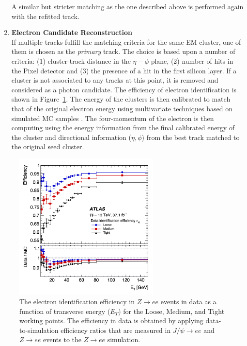 \begin{enumerate}
        A similar but stricter matching as the one described above is performed again with the refitted track.
    \item \textbf{Electron Candidate Reconstruction}\\
        If multiple tracks fulfill the matching criteria for the same EM cluster, one of them is chosen as the \textit{primary} track.
        The choice is based upon a number of criteria: (1) cluster-track distance in the $\eta-\phi$ plane, (2) number of hits in the Pixel detector and (3) the presence of a hit in the first silicon layer.
        If a cluster is not associated to any tracks at this point, it is removed and considered as a photon candidate.
        The efficiency of electron identification is shown in Figure~\ref{fig:electron_eff_Zee}.
        The energy of the clusters is then calibrated to match that of the original electron energy using multivariate techniques based on simulated MC samples \cite{Aaboud:2018ugz}.
        The four-momentum of the electron is then computing using the energy information from the final calibrated energy of the cluster and directional information ($\eta, \phi$) from the best track matched to the original seed cluster.
\end{enumerate}

\begin{figure}
	\centering
	\includegraphics[width=0.65\textwidth]{electron_eff_Zee}
	\caption{
	    The electron identification efficiency in $Z \rightarrow ee$ events in data as a function of transverse energy ($E_T$) for the Loose, Medium, and Tight working points.
	    The efficiency in data is obtained by applying data-to-simulation efficiency ratios that are measured in $J/\psi \rightarrow ee$ and $Z \rightarrow ee$ events to the $Z \rightarrow ee$ simulation.
	    \cite{Aaboud:2018ugz}
	}
	\label{fig:electron_eff_Zee}
\end{figure}


